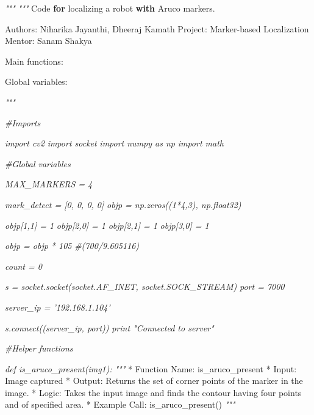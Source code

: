 \documentclass[]{article}
\newenvironment{Shaded}{}{}
\newcommand{\CommentTok}[1]{\textcolor[rgb]{0.38,0.63,0.69}{\textit{{#1}}}}
\newcommand{\ControlFlowTok}[1]{\textcolor[rgb]{0.00,0.44,0.13}{\textbf{{#1}}}}
\newcommand{\OperatorTok}[1]{\textcolor[rgb]{0.40,0.40,0.40}{{#1}}}
\newcommand{\BuiltInTok}[1]{{#1}}
\newcommand{\NormalTok}[1]{{#1}}
\begin{document}
\begin{Shaded}
\begin{Highlighting}[]
      \CommentTok{"""}
\CommentTok{     """}
\NormalTok{Code }\ControlFlowTok{for} \NormalTok{localizing a robot }\ControlFlowTok{with} \NormalTok{Aruco markers.}

\NormalTok{Authors: Niharika Jayanthi, Dheeraj Kamath}
\NormalTok{Project: Marker}\OperatorTok{-}\NormalTok{based Localization}
\NormalTok{Mentor: Sanam Shakya}

\NormalTok{Main functions:}

\NormalTok{Global variables:}

\CommentTok{"""}

\CommentTok{#Imports}

\CommentTok{import cv2}
\CommentTok{import socket}
\CommentTok{import numpy as np}
\CommentTok{import math}



\CommentTok{#Global variables}

\CommentTok{MAX_MARKERS = 4}

\CommentTok{mark_detect = [0, 0, 0, 0]}
\CommentTok{    }
\CommentTok{objp = np.zeros((1*4,3), np.float32)}

\CommentTok{objp[1,1] = 1}
\CommentTok{objp[2,0] = 1}
\CommentTok{objp[2,1] = 1}
\CommentTok{objp[3,0] = 1}

\CommentTok{objp = objp * 105}
\CommentTok{#(700/9.605116)}

\CommentTok{count = 0}

\CommentTok{s = socket.socket(socket.AF_INET, socket.SOCK_STREAM)}
\CommentTok{port = 7000}

\CommentTok{server_ip = '192.168.1.104'}

\CommentTok{s.connect((server_ip, port))}
\CommentTok{print "Connected to server"}


\CommentTok{#Helper functions}

\CommentTok{def is_aruco_present(img1):}
\CommentTok{    """}
    \OperatorTok{*} \NormalTok{Function Name:    is_aruco_present}
    \OperatorTok{*} \NormalTok{Input:        Image captured}
    \OperatorTok{*} \NormalTok{Output:       Returns the }\BuiltInTok{set} \NormalTok{of corner points of the marker }\OperatorTok{in} \NormalTok{the}
                        \NormalTok{image.}
    \OperatorTok{*} \NormalTok{Logic:            Takes the }\BuiltInTok{input} \NormalTok{image }\OperatorTok{and} \NormalTok{finds the contour having four points }\OperatorTok{and} \NormalTok{of specified area. }
    \OperatorTok{*} \NormalTok{Example Call: is_aruco_present()}
    \CommentTok{"""}


\end{Highlighting}
\end{Shaded}
\end{document}
